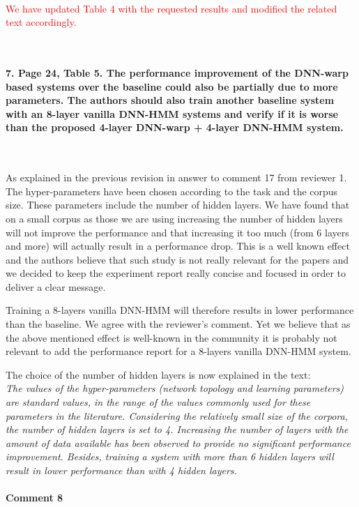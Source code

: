 \documentclass[]{article}
\begin{document}
~

\textcolor{red}{We have updated Table 4 with the requested results and modified the related text accordingly.}

~


\paragraph{7. Page 24, Table 5. The performance improvement of the DNN-warp based systems over the baseline could also be partially due to more parameters. The authors should also train another baseline system with an 8-layer vanilla DNN-HMM systems and verify if it is worse than the proposed 4-layer DNN-warp + 4-layer DNN-HMM system.}

~

As explained in the previous revision in answer to comment 17 from reviewer 1. The hyper-parameters have been chosen according to the task and the corpus size. These parameters include the number of hidden layers. We have found that on a small corpus as those we are using increasing the number of hidden layers will not improve the performance and that increasing it too much (from 6 layers and more) will actually result in a performance drop. This is a well known effect and the authors believe that such study is not really relevant for the papers and we decided to keep the experiment report really concise and focused in order to deliver a clear message.
 
Training a 8-layers vanilla DNN-HMM will therefore results in lower performance than the baseline. We agree with the reviewer's comment. Yet we believe that as the above mentioned effect is well-known in the community it is probably not relevant to add the performance report for a 8-layers vanilla DNN-HMM system.

The choice of the number of hidden layers is now explained in the text:\\
\textit{The values of the hyper-parameters (network topology and learning parameters) are standard values, in the range of the values commonly used for these parameters in the literature. Considering the relatively small size of the corpora, the number of hidden layers is set to 4. Increasing the number of layers with the amount of data available has been observed to provide no significant performance improvement. Besides, training a system with more than 6 hidden layers will result in lower performance than with 4 hidden layers.}
\paragraph{Comment 8}
\end{document}
